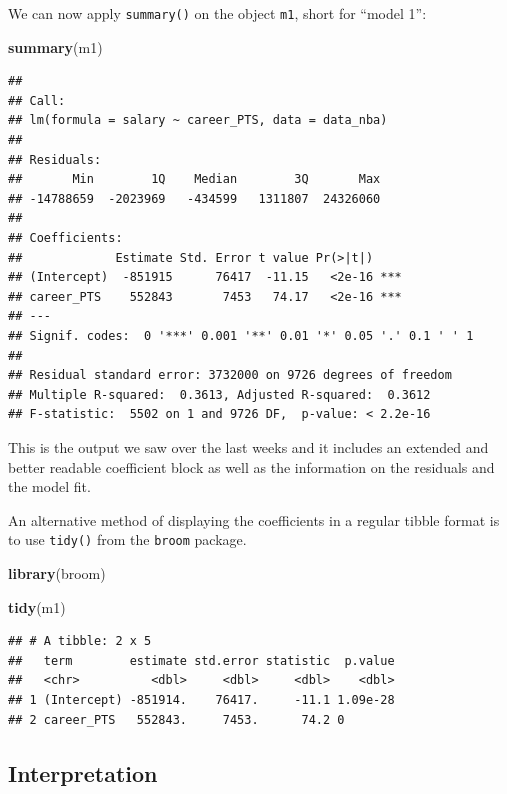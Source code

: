 \documentclass[
]{book}
\newenvironment{Shaded}{\begin{snugshade}}{\end{snugshade}}
\newcommand{\FunctionTok}[1]{\textcolor[rgb]{0.13,0.29,0.53}{\textbf{#1}}}
\newcommand{\NormalTok}[1]{#1}
\begin{document}
We can now apply \texttt{summary()} on the object \texttt{m1}, short for ``model 1'':

\begin{Shaded}
\begin{Highlighting}[]
\FunctionTok{summary}\NormalTok{(m1)}
\end{Highlighting}
\end{Shaded}

\begin{verbatim}
## 
## Call:
## lm(formula = salary ~ career_PTS, data = data_nba)
## 
## Residuals:
##       Min        1Q    Median        3Q       Max 
## -14788659  -2023969   -434599   1311807  24326060 
## 
## Coefficients:
##             Estimate Std. Error t value Pr(>|t|)    
## (Intercept)  -851915      76417  -11.15   <2e-16 ***
## career_PTS    552843       7453   74.17   <2e-16 ***
## ---
## Signif. codes:  0 '***' 0.001 '**' 0.01 '*' 0.05 '.' 0.1 ' ' 1
## 
## Residual standard error: 3732000 on 9726 degrees of freedom
## Multiple R-squared:  0.3613, Adjusted R-squared:  0.3612 
## F-statistic:  5502 on 1 and 9726 DF,  p-value: < 2.2e-16
\end{verbatim}

This is the output we saw over the last weeks and it includes an
extended and better readable coefficient block as well as the
information on the residuals and the model fit.

An alternative method of displaying the coefficients in a regular tibble
format is to use \texttt{tidy()} from the \texttt{broom} package.

\begin{Shaded}
\begin{Highlighting}[]
\FunctionTok{library}\NormalTok{(broom)}

\FunctionTok{tidy}\NormalTok{(m1)}
\end{Highlighting}
\end{Shaded}

\begin{verbatim}
## # A tibble: 2 x 5
##   term        estimate std.error statistic  p.value
##   <chr>          <dbl>     <dbl>     <dbl>    <dbl>
## 1 (Intercept) -851914.    76417.     -11.1 1.09e-28
## 2 career_PTS   552843.     7453.      74.2 0
\end{verbatim}

\hypertarget{interpretation}{%
\subsection{Interpretation}\label{interpretation}}
\end{document}
